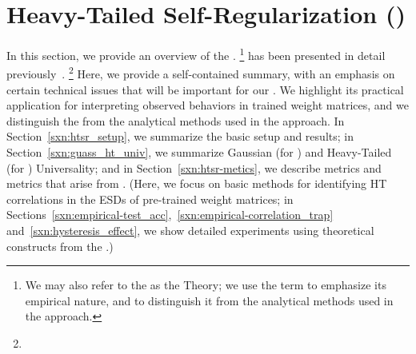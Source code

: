 \section{Heavy-Tailed Self-Regularization (\HTSR)}
\label{sxn:htsr}

In this section, we provide an overview of the \HTSR \Phenomenology.%
\footnote{We may also refer to the \HTSR \Phenomenology as the \HTSR Theory; we use the term \Phenomenology to emphasize its empirical nature, and to distinguish it from the analytical methods used in the \SETOL approach.}
\HTSR has been presented in detail previously~\cite{MM19_HTSR_ICML,MM20_SDM,MM18_TR_JMLRversion}.%
\footnote{} 
Here, we provide a self-contained summary, with an emphasis on certain technical issues that will be important for our
\SETOL. We highlight its practical application for interpreting observed behaviors in trained weight matrices, and 
we distinguish the \HTSR \Phenomenology from the analytical methods used in the \SETOL approach.
In Section~\ref{sxn:htsr_setup}, we summarize the basic \HTSR setup and results;
in Section~\ref{sxn:guass_ht_univ}, we summarize Gaussian (for \RMT) and Heavy-Tailed (for \HTRMT) Universality; and
in Section~\ref{sxn:htsr-metics}, we describe \SHAPE metrics and \SCALE metrics that arise from \HTSR.
(Here, we focus on basic methods for identifying HT correlations in the ESDs of pre-trained weight matrices; 
in Sections~\ref{sxn:empirical-test_acc},~\ref{sxn:empirical-correlation_trap} and~\ref{sxn:hysteresis_effect}, we show detailed experiments using theoretical constructs from the \HTSR \Phenomenology.)





